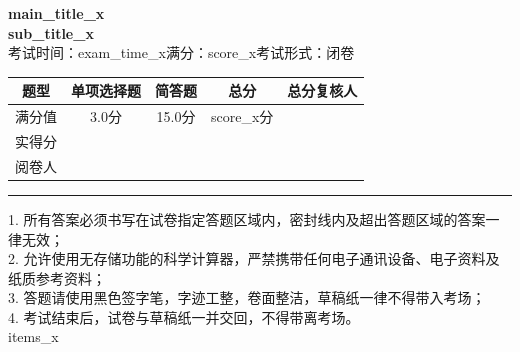 \documentclass[12pt,a3paper,twocolumn]{ctexart}
\newcommand{\subTitle}{sub\_title\_x}
\newcommand{\mainTitle}{main\_title\_x}
\newcommand{\examtime}{exam_time_x}
\newcommand{\examscore}{score_x}
\begin{document}
\begin{center}
    {\bfseries \mainTitle} \\
    \vspace{5pt}
    {\bfseries \subTitle} \\
    \vspace{5pt}
     考试时间：\examtime \quad 满分：\examscore \quad 考试形式：闭卷
\end{center}
\begin{center}
\begin{tabular}{|c|c|c|c|c|}
\hline
题型 & 单项选择题 & 简答题 & 总分 & 总分复核人 \\
\hline
满分值 & 3.0分 & 15.0分 & score_x分 & \multirow{2}{*}{} \\
\hline
实得分 & & & & \\
\hline
阅卷人 & & & & \\
\hline
\end{tabular}
\end{center}
\hrule
\vspace{8pt}
1. 所有答案必须书写在试卷指定答题区域内，密封线内及超出答题区域的答案一律无效；\\
2. 允许使用无存储功能的科学计算器，严禁携带任何电子通讯设备、电子资料及纸质参考资料；\\
3. 答题请使用黑色签字笔，字迹工整，卷面整洁，草稿纸一律不得带入考场；\\
4. 考试结束后，试卷与草稿纸一并交回，不得带离考场。\\
\vspace{12pt}
items_x
\end{document}
